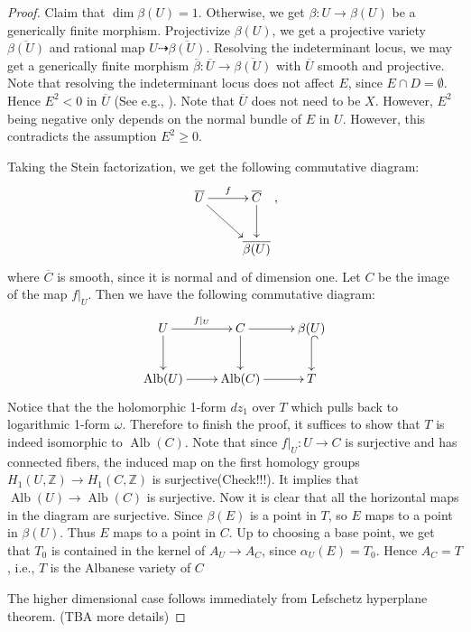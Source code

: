 \documentclass[a4paper,12pt,reqno]{amsart}
\theoremstyle{plain}
\theoremstyle{definition}
\theoremstyle{remark}
\newcommand{\Z}{\mathbb Z}
\newcommand{\C}{\mathbb C}
\newcommand{\Alb}{\operatorname{Alb}}
\begin{document}
\begin{proof}
Claim that $\dim\beta(U)=1$. Otherwise, we get $\beta: U\to \beta(U)$ be a generically finite morphism. Projectivize $\beta(U)$, we get a projective variety $\overline{\beta(U)}$ and rational map $U\dasharrow \overline{\beta(U)}$. Resolving the indeterminant locus, we may get a generically finite morphism $\overline{\beta}:\overline{U}\to\overline{\beta(U)}$ with $\overline{U}$ smooth and projective. %
Note that resolving the indeterminant locus does not affect $E$, since $E\cap D=\emptyset$. Hence $E^2<0$ in $\overline{U}$ (See e.g., \cite[Theorem 10.1]{KK}). Note that $\overline{U}$ does not need to be $X$. However, $E^2$ being negative only depends on the normal bundle of $E$ in $U$. However, this contradicts the assumption $E^2\geq 0$. 

Taking the Stein factorization, we get the following commutative diagram:
$$\xymatrix{
\overline{U} \ar[rd] \ar[r]^f & \overline{ C} \ar[d]  \\
& \overline{\beta(U)}
},$$
 where $\overline{C}$ is smooth, since it is normal and of dimension one. Let $C$ be the image of the map $f|_U$. Then we have the following commutative diagram:
 $$ \xymatrix{
U \ar[r]^{f|_U} \ar[d] & C \ar[r] \ar[d] & \beta(U) \ar@{^{(}->}[d] \\ 
\Alb(U) \ar[r] & \Alb(C) \ar[r] & T }
 $$
Notice that the the holomorphic 1-form $dz_1$ over $T$ which pulls back to logarithmic 1-form $\omega$. Therefore to finish the proof, it suffices to show that $T$ is indeed isomorphic to $\Alb(C)$. 
Note that since $f|_U:U\to C$ is surjective and has connected fibers, the induced map on the first homology groups $H_1(U,\Z) \to H_1(C,\Z)$ is surjective{\color{red}(Check!!!)}. It implies that $\Alb(U) \to \Alb(C)$ is surjective. Now it is clear that all the horizontal maps in the diagram are surjective. 
Since $\beta(E)$ is a point in $T$, so $E$ maps to a point in $\beta(U)$. Thus $E$ maps to a point in $C$. Up to choosing a base point, we get that $ T_0$ is contained in the kernel of $A_U \to A_C$, since $\alpha_U(E)=T_0$. Hence $A_C=T$, i.e., $T$ is the Albanese variety of $C$




The higher dimensional case follows immediately from Lefschetz hyperplane theorem. (TBA more details)
\end{proof}
\end{document}
